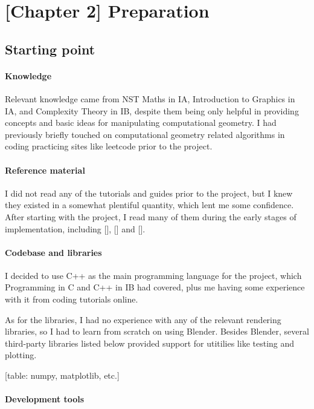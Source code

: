 \documentclass[runningheads]{llncs}
\begin{document}
\chapter{[Chapter 2] Preparation}

\section{Starting point}

\subsubsection{Knowledge}

Relevant knowledge came from NST Maths in IA, Introduction to Graphics in IA, and Complexity Theory in IB, despite them being only helpful in providing concepts and basic ideas for manipulating computational geometry. I had previously briefly touched on computational geometry related algorithms in coding practicing sites like leetcode prior to the project.

\subsubsection{Reference material}

I did not read any of the tutorials and guides prior to the project, but I knew they existed in a somewhat plentiful quantity, which lent me some confidence. After starting with the project, I read many of them during the early stages of implementation, including [], [] and [].

\subsubsection{Codebase and libraries}

I decided to use C++ as the main programming language for the project, which Programming in C and C++ in IB had covered, plus me having some experience with it from coding tutorials online.

As for the libraries, I had no experience with any of the relevant rendering libraries, so I had to learn from scratch on using Blender. Besides Blender, several third-party libraries listed below provided support for utitilies like testing and plotting.

[table: numpy, matplotlib, etc.]

\subsubsection{Development tools}
\end{document}

